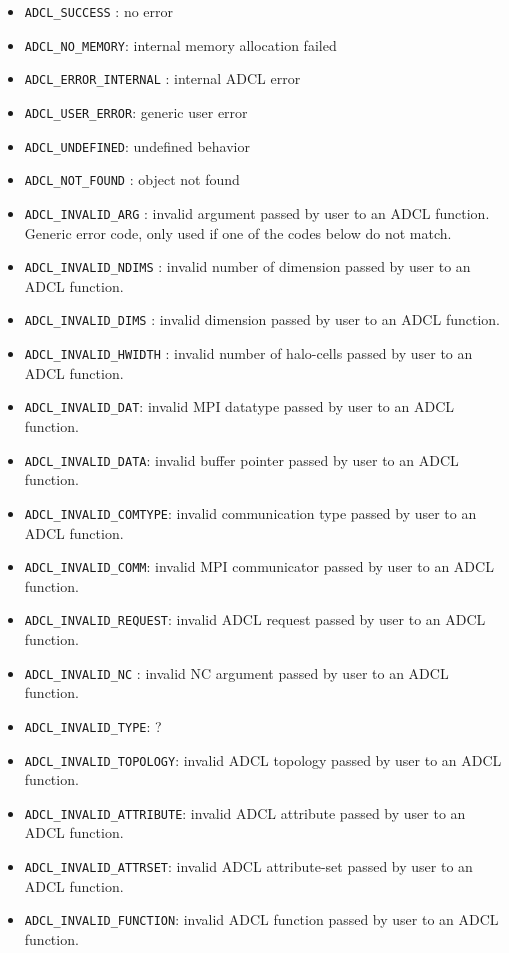 \begin{itemize}
\item {\tt ADCL\_SUCCESS} : no error
\item {\tt ADCL\_NO\_MEMORY}: internal memory allocation failed
\item {\tt ADCL\_ERROR\_INTERNAL} : internal ADCL error
\item {\tt ADCL\_USER\_ERROR}: generic user error
\item {\tt ADCL\_UNDEFINED}: undefined behavior
\item {\tt ADCL\_NOT\_FOUND} : object not found

\item {\tt ADCL\_INVALID\_ARG} : invalid argument passed by user to an ADCL function. Generic error code, only used if one of the codes below do not match.
\item {\tt ADCL\_INVALID\_NDIMS} : invalid number of dimension passed by user to an ADCL function.
\item {\tt ADCL\_INVALID\_DIMS} : invalid dimension passed by user to an ADCL function.
\item {\tt ADCL\_INVALID\_HWIDTH} : invalid number of halo-cells passed by user to an ADCL function.
\item {\tt ADCL\_INVALID\_DAT}: invalid MPI datatype passed by user to an ADCL function.
\item {\tt ADCL\_INVALID\_DATA}: invalid buffer pointer passed by user to an ADCL function.
\item {\tt ADCL\_INVALID\_COMTYPE}: invalid communication type passed by user to an ADCL function.
\item {\tt ADCL\_INVALID\_COMM}: invalid MPI communicator passed by user to an ADCL function.
\item {\tt ADCL\_INVALID\_REQUEST}: invalid ADCL request passed by user to an ADCL function.
\item {\tt ADCL\_INVALID\_NC} : invalid NC argument passed by user to an ADCL function.
\item {\tt ADCL\_INVALID\_TYPE}: ?
\item {\tt ADCL\_INVALID\_TOPOLOGY}: invalid ADCL topology passed by user to an ADCL function.
\item {\tt ADCL\_INVALID\_ATTRIBUTE}: invalid ADCL attribute passed by user to an ADCL function.
\item {\tt ADCL\_INVALID\_ATTRSET}: invalid ADCL attribute-set passed by user to an ADCL function.
\item {\tt ADCL\_INVALID\_FUNCTION}: invalid ADCL function passed by user to an ADCL function.

\end{itemize}

